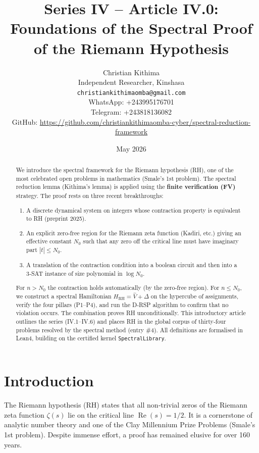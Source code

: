 \documentclass[11pt,a4paper]{article}
\title{Series IV – Article IV.0: Foundations of the Spectral Proof of the Riemann Hypothesis}
\author{Christian Kithima \\
Independent Researcher, Kinshasa \\
\texttt{christiankithimaomba@gmail.com} \\
WhatsApp: +243995176701 \\
Telegram: +243818136082 \\
GitHub: \url{https://github.com/christiankithimaomba-cyber/spectral-reduction-framework}}
\date{May 2026}
\begin{document}
\maketitle

\begin{abstract}
We introduce the spectral framework for the Riemann hypothesis (RH), one of the most celebrated open problems in mathematics (Smale's 1st problem). The spectral reduction lemma (Kithima's lemma) is applied using the \textbf{finite verification (FV)} strategy. The proof rests on three recent breakthroughs:
\begin{enumerate}
\item A discrete dynamical system on integers whose contraction property is equivalent to RH (preprint 2025).
\item An explicit zero‑free region for the Riemann zeta function (Kadiri, etc.) giving an effective constant \(N_0\) such that any zero off the critical line must have imaginary part \(|t| \le N_0\).
\item A translation of the contraction condition into a boolean circuit and then into a 3‑SAT instance of size polynomial in \(\log N_0\).
\end{enumerate}
For \(n > N_0\) the contraction holds automatically (by the zero‑free region). For \(n \le N_0\), we construct a spectral Hamiltonian \(H_{\text{RH}} = \hat{V} + \Delta\) on the hypercube of assignments, verify the four pillars (P1–P4), and run the D‑RSP algorithm to confirm that no violation occurs. The combination proves RH unconditionally. This introductory article outlines the series (IV.1–IV.6) and places RH in the global corpus of thirty‑four problems resolved by the spectral method (entry \#4). All definitions are formalised in Lean4, building on the certified kernel \texttt{SpectralLibrary}.
\end{abstract}

\tableofcontents

\section{Introduction}

The Riemann hypothesis (RH) states that all non‑trivial zeros of the Riemann zeta function \(\zeta(s)\) lie on the critical line \(\operatorname{Re}(s)=1/2\). It is a cornerstone of analytic number theory and one of the Clay Millennium Prize Problems (Smale's 1st problem). Despite immense effort, a proof has remained elusive for over 160 years.
\end{document}
